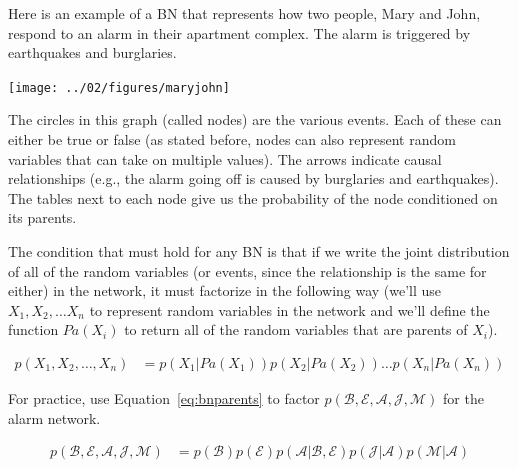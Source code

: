 \documentclass[review_Solutions]{subfiles}
\begin{document}
Here is an example of a BN that represents how two people, Mary and John, respond to an alarm in their apartment complex.  The alarm is triggered by earthquakes and burglaries.

\begin{center}
\texttt{[image: ../02/figures/maryjohn]}
\end{center}

The circles in this graph (called nodes) are the various events.  Each of these can either be true or false (as stated before, nodes can also represent random variables that can take on multiple values).  The arrows indicate causal relationships (e.g., the alarm going off is caused by burglaries and earthquakes).  The tables next to each node give us the probability of the node conditioned on its parents.

 The condition that must hold for any BN is that if we write the joint distribution of all of the random variables (or events, since the relationship is the same for either) in the network, it must factorize in the following way (we'll use $X_1, X_2, \ldots X_n$ to represent random variables in the network and we'll define the function $Pa(X_i)$ to return all of the random variables that are parents of $X_i$).

\begin{align}
p(X_1, X_2, \ldots, X_n) &= p(X_1 | Pa(X_1)) p(X_2 | Pa(X_2)) \ldots p(X_n | Pa(X_n)) \label{eq:bnparents}
\end{align}

\begin{exercise}
For practice, use Equation~\ref{eq:bnparents} to factor $p(\mathcal{B}, \mathcal{E}, \mathcal{A}, \mathcal{J}, \mathcal{M})$ for the alarm network.
\begin{boxedsolution}
\begin{align}
p(\mathcal{B}, \mathcal{E}, \mathcal{A}, \mathcal{J}, \mathcal{M}) &= p(\mathcal{B}) p(\mathcal{E}) p(\mathcal{A} | \mathcal{B}, \mathcal{E}) p(\mathcal{J} | \mathcal{A}) p(\mathcal{M} | \mathcal{A})   \nonumber
\end{align}
\end{boxedsolution}
\end{exercise}
\end{document}
